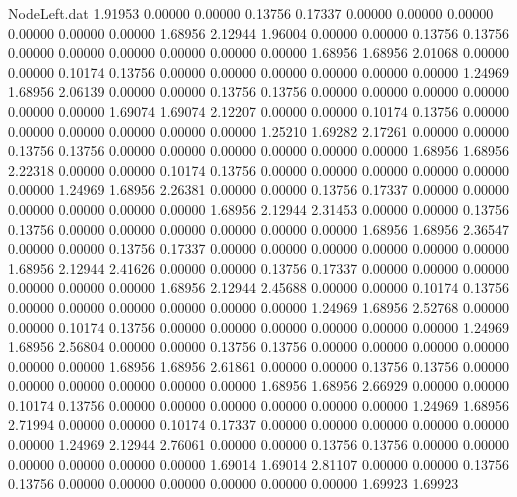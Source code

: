 \begin{filecontents}{NodeLeft.dat}
   1.91953    0.00000    0.00000     0.13756    0.17337    0.00000    0.00000    0.00000    0.00000    0.00000    0.00000    1.68956    2.12944
   1.96004    0.00000    0.00000     0.13756    0.13756    0.00000    0.00000    0.00000    0.00000    0.00000    0.00000    1.68956    1.68956
   2.01068    0.00000    0.00000     0.10174    0.13756    0.00000    0.00000    0.00000    0.00000    0.00000    0.00000    1.24969    1.68956
   2.06139    0.00000    0.00000     0.13756    0.13756    0.00000    0.00000    0.00000    0.00000    0.00000    0.00000    1.69074    1.69074
   2.12207    0.00000    0.00000     0.10174    0.13756    0.00000    0.00000    0.00000    0.00000    0.00000    0.00000    1.25210    1.69282
   2.17261    0.00000    0.00000     0.13756    0.13756    0.00000    0.00000    0.00000    0.00000    0.00000    0.00000    1.68956    1.68956
   2.22318    0.00000    0.00000     0.10174    0.13756    0.00000    0.00000    0.00000    0.00000    0.00000    0.00000    1.24969    1.68956
   2.26381    0.00000    0.00000     0.13756    0.17337    0.00000    0.00000    0.00000    0.00000    0.00000    0.00000    1.68956    2.12944
   2.31453    0.00000    0.00000     0.13756    0.13756    0.00000    0.00000    0.00000    0.00000    0.00000    0.00000    1.68956    1.68956
   2.36547    0.00000    0.00000     0.13756    0.17337    0.00000    0.00000    0.00000    0.00000    0.00000    0.00000    1.68956    2.12944
   2.41626    0.00000    0.00000     0.13756    0.17337    0.00000    0.00000    0.00000    0.00000    0.00000    0.00000    1.68956    2.12944
   2.45688    0.00000    0.00000     0.10174    0.13756    0.00000    0.00000    0.00000    0.00000    0.00000    0.00000    1.24969    1.68956
   2.52768    0.00000    0.00000     0.10174    0.13756    0.00000    0.00000    0.00000    0.00000    0.00000    0.00000    1.24969    1.68956
   2.56804    0.00000    0.00000     0.13756    0.13756    0.00000    0.00000    0.00000    0.00000    0.00000    0.00000    1.68956    1.68956
   2.61861    0.00000    0.00000     0.13756    0.13756    0.00000    0.00000    0.00000    0.00000    0.00000    0.00000    1.68956    1.68956
   2.66929    0.00000    0.00000     0.10174    0.13756    0.00000    0.00000    0.00000    0.00000    0.00000    0.00000    1.24969    1.68956
   2.71994    0.00000    0.00000     0.10174    0.17337    0.00000    0.00000    0.00000    0.00000    0.00000    0.00000    1.24969    2.12944
   2.76061    0.00000    0.00000     0.13756    0.13756    0.00000    0.00000    0.00000    0.00000    0.00000    0.00000    1.69014    1.69014
   2.81107    0.00000    0.00000     0.13756    0.13756    0.00000    0.00000    0.00000    0.00000    0.00000    0.00000    1.69923    1.69923

\end{filecontents}
